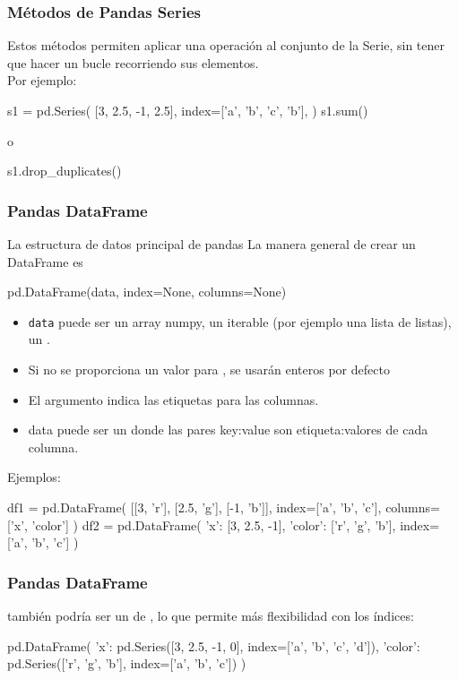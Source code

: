 \documentclass[9pt]{beamer}
\begin{document}
\begin{frame}[fragile]
  \frametitle{Métodos de Pandas Series}
  Estos métodos permiten aplicar una operación al conjunto de la Serie, sin tener que hacer un bucle recorriendo sus elementos.\\
  Por ejemplo:
  \begin{pyconsole}
s1 = pd.Series(
        [3, 2.5, -1, 2.5],
        index=['a', 'b', 'c', 'b'],
)
s1.sum()
  \end{pyconsole}
\pause  o
  \begin{pyconsole}
s1.drop_duplicates()
  \end{pyconsole}
  
\end{frame}
\begin{frame}[fragile]
  \frametitle{Pandas DataFrame}
  \begin{block}{La estructura de datos principal de pandas}
      La manera general de crear un DataFrame es
  \begin{pyverbatim}
    pd.DataFrame(data, index=None, columns=None)
  \end{pyverbatim}
  \end{block}
  \begin{itemize}
  \item   {\tt data} puede ser un array numpy, un iterable (por ejemplo una lista de listas), un .
  \item Si no se proporciona un valor para , se usarán enteros por defecto
  \item El argumento  indica las etiquetas para las columnas.
  \item data puede ser un  donde las pares key:value son etiqueta:valores de cada columna.
  \end{itemize}\pause
{\footnotesize  Ejemplos:
  \begin{pyblock}
df1 = pd.DataFrame(
        [[3, 'r'],
         [2.5, 'g'],
         [-1, 'b']],
        index=['a', 'b', 'c'],
        columns=['x', 'color']
)
df2 = pd.DataFrame(
        {'x': [3, 2.5, -1],
         'color': ['r', 'g', 'b']},
        index=['a', 'b', 'c']
)
  \end{pyblock}
  }
\end{frame}
\begin{frame}[fragile]
  \frametitle{Pandas DataFrame}
   también podría ser un  de , lo que permite más flexibilidad con los índices: 
  \begin{pyconsole}
pd.DataFrame(
  {'x': pd.Series([3, 2.5, -1, 0], index=['a', 'b', 'c', 'd']),
   'color': pd.Series(['r', 'g', 'b'], index=['a', 'b', 'c'])}
)
  \end{pyconsole}
\end{frame}
\end{document}
